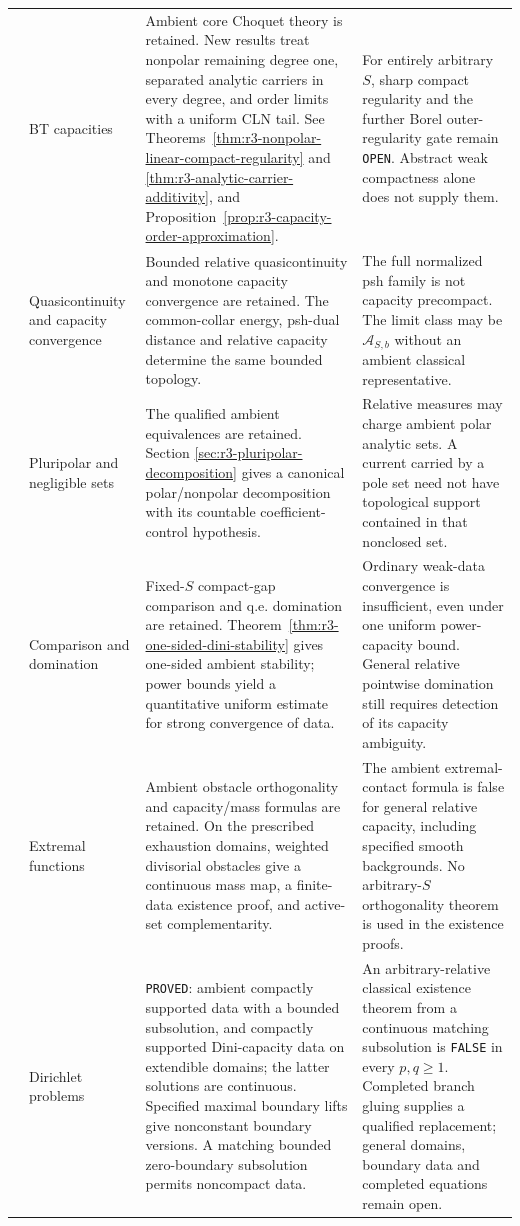 \documentclass[11pt,a4paper]{article}
\numberwithin{equation}{section}
\theoremstyle{definition}
\theoremstyle{remark}
\begin{document}
\begin{longtable}{@{}>{\raggedright\arraybackslash}p{}>{\raggedright\arraybackslash}p{}>{\raggedright\arraybackslash}p{}>{\raggedright\arraybackslash}p{}@{}}
6 & BT capacities &
Ambient core Choquet theory is retained. New results treat nonpolar
remaining degree one, separated analytic carriers in every degree,
and order limits with a uniform CLN tail. See
Theorems~\ref{thm:r3-nonpolar-linear-compact-regularity} and
\ref{thm:r3-analytic-carrier-additivity}, and
Proposition~\ref{prop:r3-capacity-order-approximation}. &
For entirely arbitrary $S$, sharp compact regularity and the further
Borel outer-regularity gate remain \texttt{OPEN}. Abstract weak
compactness alone does not supply them.\\[4pt]
7 & Quasicontinuity and capacity convergence &
Bounded relative quasicontinuity and monotone capacity convergence
are retained. The common-collar energy, psh-dual distance and
relative capacity determine the same bounded topology. &
The full normalized psh family is not capacity precompact.
The limit class may be $\mathcal A_{S,b}$ without an ambient
classical representative.\\[4pt]
8 & Pluripolar and negligible sets &
The qualified ambient equivalences are retained. Section
\ref{sec:r3-pluripolar-decomposition} gives a canonical polar/nonpolar
decomposition with its countable coefficient-control hypothesis. &
Relative measures may charge ambient polar analytic sets. A current
carried by a pole set need not have topological support contained
in that nonclosed set.\\[4pt]
9 & Comparison and domination &
Fixed-$S$ compact-gap comparison and q.e. domination are retained.
Theorem~\ref{thm:r3-one-sided-dini-stability} gives one-sided
ambient stability; power bounds yield a quantitative uniform
estimate for strong convergence of data. &
Ordinary weak-data convergence is insufficient, even under one
uniform power-capacity bound. General relative pointwise
domination still requires detection of its capacity ambiguity.\\[4pt]
10 & Extremal functions &
Ambient obstacle orthogonality and capacity/mass formulas are
retained. On the prescribed exhaustion domains, weighted divisorial obstacles
give a continuous mass map, a finite-data existence proof, and
active-set complementarity. &
The ambient extremal-contact formula is false for general relative
capacity, including specified smooth backgrounds. No arbitrary-$S$
orthogonality theorem is used in the existence proofs.\\[4pt]
11 & Dirichlet problems &
\texttt{PROVED}: ambient compactly supported data with a bounded
subsolution, and compactly supported Dini-capacity data on extendible
domains; the latter solutions are continuous. Specified maximal
boundary lifts give nonconstant boundary versions. A matching bounded
zero-boundary subsolution permits noncompact data. &
An arbitrary-relative classical existence theorem from a continuous
matching subsolution is \texttt{FALSE} in every $p,q\geq1$.
Completed branch gluing supplies a qualified replacement;
general domains, boundary data and completed equations remain open.\\
\hline
\end{longtable}
\end{document}
